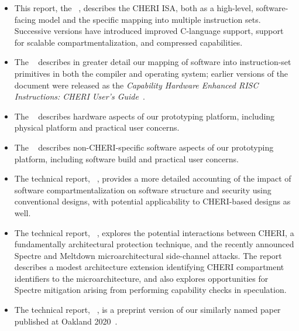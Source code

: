 \begin{itemize}
\item This report, the ~\cite{UCAM-CL-TR-850, UCAM-CL-TR-864,
  UCAM-CL-TR-876, UCAM-CL-TR-891, UCAM-CL-TR-907, UCAM-CL-TR-927,
  UCAM-CL-TR-951, UCAM-CL-TR-987},
  describes the CHERI ISA, both as a high-level, software-facing
  model and the specific mapping into multiple instruction sets.
  Successive versions have introduced improved C-language support, support for
  scalable compartmentalization, and compressed capabilities.

\item The ~\cite{UCAM-CL-TR-877} describes in greater detail our
  mapping of software into instruction-set primitives in both the compiler and
  operating system; earlier versions of the document were released as the
  \textit{Capability Hardware Enhanced RISC Instructions: CHERI User's
  Guide}~\cite{UCAM-CL-TR-851}.

\item The ~\cite{UCAM-CL-TR-852, UCAM-CL-TR-868} describes hardware aspects
  of our prototyping platform, including physical platform and practical user
  concerns.

\item The ~\cite{UCAM-CL-TR-853, UCAM-CL-TR-869} describes
  non-CHERI-specific software aspects of our prototyping platform, including
  software build and practical user concerns.

\item The technical report, ~\cite{UCAM-CL-TR-873}, provides a more
  detailed accounting of the impact of software compartmentalization on
  software structure and security using conventional designs, with potential
  applicability to CHERI-based designs as well.

\item The technical report, ~\cite{UCAM-CL-TR-916},
  explores the potential interactions between
  CHERI, a fundamentally architectural protection technique, and the recently
  announced Spectre and Meltdown microarchitectural side-channel attacks.
  The report describes a modest architecture extension identifying CHERI
  compartment identifiers to the microarchitecture, and also explores
  opportunities for Spectre mitigation arising from performing capability
  checks in speculation.

\item The technical report, ~\cite{UCAM-CL-TR-940},
  is a preprint version of our similarly named
  paper published at Oakland 2020~\cite{cheri-formal-SP2020}.


\end{itemize}
